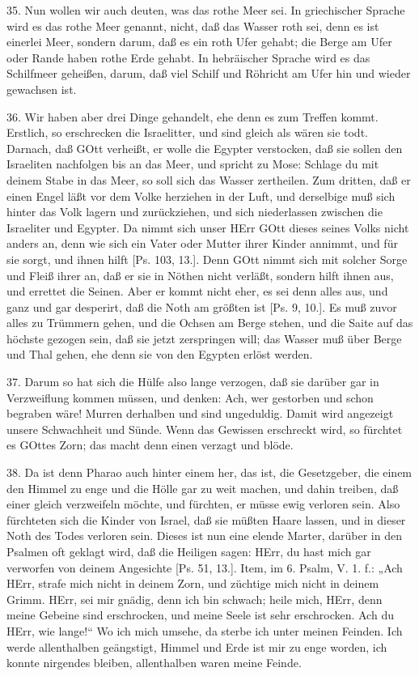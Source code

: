 35. Nun wollen wir auch deuten, was das rothe Meer sei. In griechischer Sprache wird es das rothe Meer genannt, nicht, daß das Wasser roth sei, denn es ist einerlei Meer, sondern darum, daß es ein roth Ufer gehabt; die Berge am Ufer oder Rande haben rothe Erde gehabt. In hebräischer Sprache wird es das Schilfmeer geheißen, darum, daß viel Schilf und Röhricht am Ufer hin und wieder gewachsen ist.

36. Wir haben aber drei Dinge gehandelt, ehe denn es zum Treffen kommt. Erstlich, so erschrecken die Israelitter, und sind gleich als wären sie todt. Darnach, daß GOtt verheißt, er wolle die Egypter verstocken, daß sie sollen den Israeliten nachfolgen bis an das Meer, und spricht zu Mose: Schlage du mit deinem Stabe in das Meer, so soll sich das Wasser zertheilen. Zum dritten, daß er einen Engel läßt vor dem Volke herziehen in der Luft, und derselbige muß sich hinter das Volk lagern und zurückziehen, und sich niederlassen zwischen die Israeliter und Egypter. Da nimmt sich unser HErr GOtt dieses seines Volks nicht anders an, denn wie sich ein Vater oder Mutter ihrer Kinder annimmt, und für sie sorgt, und ihnen hilft [Ps. 103, 13.]. Denn GOtt nimmt sich mit solcher Sorge und Fleiß ihrer an, daß er sie in Nöthen nicht verläßt, sondern hilft ihnen aus, und errettet die Seinen. Aber er kommt nicht eher, es sei denn alles aus, und ganz und gar desperirt, daß die Noth am größten ist [Ps. 9, 10.]. Es muß zuvor alles zu Trümmern gehen, und die Ochsen am Berge stehen, und die Saite auf das höchste gezogen sein, daß sie jetzt zerspringen will; das Wasser muß über Berge und Thal gehen, ehe denn sie von den Egypten erlöst werden.

37. Darum so hat sich die Hülfe also lange verzogen, daß sie darüber gar in Verzweiflung kommen müssen, und denken: Ach, wer gestorben und schon begraben wäre! Murren derhalben und sind ungeduldig. Damit wird angezeigt unsere Schwachheit und Sünde. Wenn das Gewissen erschreckt wird, so fürchtet es GOttes Zorn; das macht denn einen verzagt und blöde.

38. Da ist denn Pharao auch hinter einem her, das ist, die Gesetzgeber, die einem den Himmel zu enge und die Hölle gar zu weit machen, und dahin treiben, daß einer gleich verzweifeln möchte, und fürchten, er müsse ewig verloren sein. Also fürchteten sich die Kinder von Israel, daß sie müßten Haare lassen, und in dieser Noth des Todes verloren sein. Dieses ist nun eine elende Marter, darüber in den Psalmen oft geklagt wird, daß die Heiligen sagen: HErr, du hast mich gar verworfen von deinem Angesichte [Ps. 51, 13.]. Item, im 6. Psalm, V. 1. f.: „Ach HErr, strafe mich nicht in deinem Zorn, und züchtige mich nicht in deinem Grimm. HErr, sei mir gnädig, denn ich bin schwach; heile mich, HErr, denn meine Gebeine sind erschrocken, und meine Seele ist sehr erschrocken. Ach du HErr, wie lange!“ Wo ich mich umsehe, da sterbe ich unter meinen Feinden. Ich werde allenthalben geängstigt, Himmel und Erde ist mir zu enge worden, ich konnte nirgendes bleiben, allenthalben waren meine Feinde.

